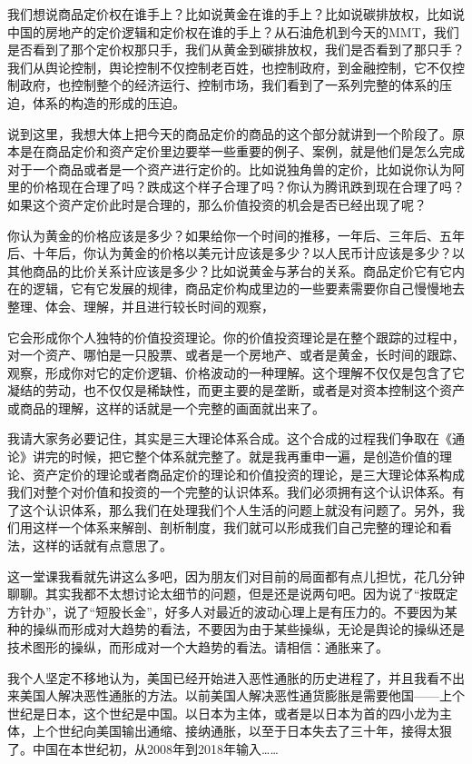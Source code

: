 \documentclass[UTF8, 12pt, a4paper]{ctexrep}
\begin{document}
我们想说商品定价权在谁手上？比如说黄金在谁的手上？比如说碳排放权，比如说中国的房地产的定价逻辑和定价权在谁的手上？从石油危机到今天的MMT，我们是否看到了那个定价权那只手，我们从黄金到碳排放权，我们是否看到了那只手？我们从舆论控制，舆论控制不仅控制老百姓，也控制政府，到金融控制，它不仅控制政府，也控制整个的经济运行、控制市场，我们看到了一系列完整的体系的压迫，体系的构造的形成的压迫。

说到这里，我想大体上把今天的商品定价的商品的这个部分就讲到一个阶段了。原本是在商品定价和资产定价里边要举一些重要的例子、案例，就是他们是怎么完成对于一个商品或者是一个资产进行定价的。比如说独角兽的定价，比如说你认为阿里的价格现在合理了吗？跌成这个样子合理了吗？你认为腾讯跌到现在合理了吗？如果这个资产定价此时是合理的，那么价值投资的机会是否已经出现了呢？

你认为黄金的价格应该是多少？如果给你一个时间的推移，一年后、三年后、五年后、十年后，你认为黄金的价格以美元计应该是多少？以人民币计应该是多少？以其他商品的比价关系计应该是多少？比如说黄金与茅台的关系。商品定价它有它内在的逻辑，它有它发展的规律，商品定价构成里边的一些要素需要你自己慢慢地去整理、体会、理解，并且进行较长时间的观察，

它会形成你个人独特的价值投资理论。你的价值投资理论是在整个跟踪的过程中，对一个资产、哪怕是一只股票、或者是一个房地产、或者是黄金，长时间的跟踪、观察，形成你对它的定价逻辑、价格波动的一种理解。这个理解不仅仅是包含了它凝结的劳动，也不仅仅是稀缺性，而更主要的是垄断，或者是对资本控制这个资产或商品的理解，这样的话就是一个完整的画面就出来了。

我请大家务必要记住，其实是三大理论体系合成。这个合成的过程我们争取在《通论》讲完的时候，把它整个体系就完整了。就是我再重申一遍，是创造价值的理论、资产定价的理论或者商品定价的理论和价值投资的理论，是三大理论体系构成我们对整个对价值和投资的一个完整的认识体系。我们必须拥有这个认识体系。有了这个认识体系，那么我们在处理我们个人生活的问题上就没有问题了。另外，我们用这样一个体系来解剖、剖析制度，我们就可以形成我们自己完整的理论和看法，这样的话就有点意思了。

这一堂课我看就先讲这么多吧，因为朋友们对目前的局面都有点儿担忧，花几分钟聊聊。其实我都不太想讨论太细节的问题，但是还是说两句吧。因为说了“按既定方针办”，说了“短股长金”，好多人对最近的波动心理上是有压力的。不要因为某种的操纵而形成对大趋势的看法，不要因为由于某些操纵，无论是舆论的操纵还是技术图形的操纵，而形成对一个大趋势的看法。请相信：通胀来了。

我个人坚定不移地认为，美国已经开始进入恶性通胀的历史进程了，并且我看不出来美国人解决恶性通胀的方法。以前美国人解决恶性通货膨胀是需要他国——上个世纪是日本，这个世纪是中国。以日本为主体，或者是以日本为首的四小龙为主体，上个世纪向美国输出通缩、接纳通胀，以至于日本失去了三十年，接得太狠了。中国在本世纪初，从2008年到2018年输入……
\end{document}
